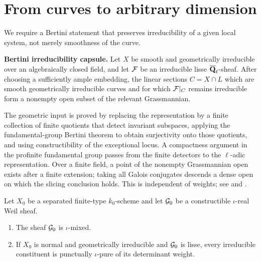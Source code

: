 \section{From curves to arbitrary dimension}

We require a Bertini statement that preserves irreducibility of a given
local system, not merely smoothness of the curve.

\begin{foundation}
\label{found:irreducibility-bertini}
\textbf{Bertini irreducibility capsule.}
Let \(X\) be smooth and geometrically irreducible over an algebraically
closed field, and let \(\mathcal F\) be an irreducible lisse
\(\overline{\mathbf Q}_\ell\)-sheaf.  After choosing a sufficiently ample embedding, the
linear sections \(C=X\cap L\) which are smooth geometrically irreducible
curves and for which \(\mathcal F|_C\) remains irreducible form a nonempty open
subset of the relevant Grassmannian.

The geometric input is proved by replacing the representation by a finite
collection of finite quotients that detect invariant subspaces, applying
the fundamental-group Bertini theorem to obtain surjectivity onto those
quotients, and using constructibility of the exceptional locus.  A
compactness argument in the profinite fundamental group passes from the
finite detectors to the \(\ell\)-adic representation.  Over a finite
field, a point of the nonempty Grassmannian open exists after a finite
extension; taking all Galois conjugates descends a dense open on which the
slicing conclusion holds.  This is independent of weights; see
\cite[Appendix~B]{KiehlWeissauer} and \cite{StanfordL22}.
\end{foundation}

\begin{theorem}
\label{thm:real-sheaf-mixed}
Let \(X_0\) be a separated finite-type \(k_0\)-scheme and let
\(\mathcal G_0\) be a constructible \(\iota\)-real Weil sheaf.
\begin{enumerate}
\item The sheaf \(\mathcal G_0\) is \(\iota\)-mixed.
\item If \(X_0\) is normal and geometrically irreducible and \(\mathcal G_0\)
is lisse, every irreducible constituent is punctually
\(\iota\)-pure of its determinant weight.
\end{enumerate}
\end{theorem}

